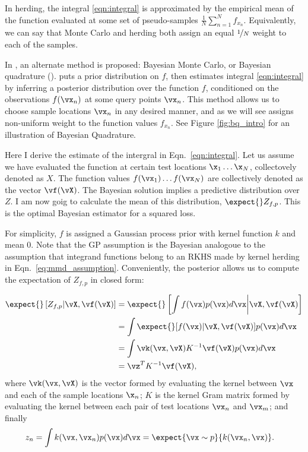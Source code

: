 In herding, the integral \eqref{eqn:integral} is approximated by the empirical mean of the function evaluated at some set of pseudo-samples $\frac{1}{N}\sum_{n=1}^{N}f_{x_n}$. Equivalently, we can say that Monte Carlo and herding both assign an equal $\nicefrac{1}{N}$ weight to each of the samples.

In \citep{BZMonteCarlo}, an alternate method is proposed: Bayesian Monte Carlo, or Bayesian quadrature (\bq). \bq{} puts a prior distribution on $f$, then estimates integral \eqref{eqn:integral} by inferring a posterior distribution over the function $f$, conditioned on the observations $f(\vx_n)$ at some query points $\vx_n$. This method allows us to choose sample locations $\vx_n$ in any desired manner, and as we will see assigns non-uniform weight to the function values $f_{x_n}$. See Figure \ref{fig:bq_intro} for an illustration of Bayesian Quadrature.

Here I derive the \bq{} estimate of the intergral in Eqn.\ \eqref{eqn:integral}. Let us assume we have evaluated the function at certain test locations $\x_1 \ldots \x_N$, collectovely denoted as $X$. The function values $f(\vx_1) \ldots f(\vx_N)$ are collectively denoted as the vector $\vf(\vX)$. The Bayesian solution implies a predictive distribution over $Z$. I am now goig to calculate the mean of this distribution, $\expect{}Z_{f,p}$. This is the optimal Bayesian estimator for a squared loss.

For simplicity, $f$ is assigned a Gaussian process prior with kernel function $k$ and mean $0$.  Note that the GP assumption is the Bayesian analogoue to the assumption that integrand functions belong to an RKHS made by kernel herding in Eqn.\ \eqref{eq:mmd_assumption}. Conveniently, the \gp{} posterior allows us to compute the expectation of $Z_{f,p}$ in closed form: 

\begin{align}
	\expect{} \left[Z_{f,p} \vert \vX, \vf(\vX) \right] &= \expect{} \left[ {\int f(\vx)p(\vx)d\vx} \middle\vert \vX, \vf(\vX) \right]\\
	 & = \int \expect{} [f(\vx) \vert \vX, \vf(\vX) ] p(\vx) d\vx\\
	 & = \int \vk(\vx, \vX) K^{-1} \vf(\vX) p(\vx) d\vx \\
	 & = \vz^T K^{-1} \vf(\vX),
	\label{eq:marg_mean_symbolic}
\end{align} 
where $\vk(\vx, \vX)$ is the vector formed by evaluating the kernel between $\vx$ and each of the sample locations $\x_n$; $K$ is the kernel Gram matrix formed by evaluating the kernel between each pair of test locations $\vx_n$ and $\vx_m$; and finally
\begin{align}
z_n & = \int k(\vx, \vx_n) p(\vx) d\vx = \expect{\vx \sim p}{k(\vx_n, \vx)}.
\end{align}

